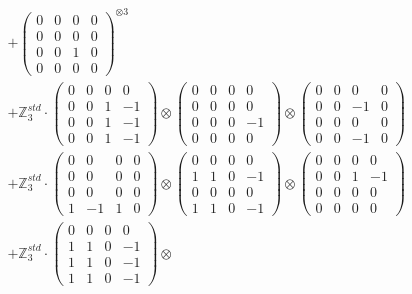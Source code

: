 \documentclass{article}
\begin{document}
{\begin{align}
        &+ \label{Rs16-Rc11-Solution-15-c16} \begin{pmatrix} 0 & 0 & 0 & 0 \\ 0 & 0 & 0 & 0 \\ 0 & 0 & 1 & 0 \\ 0 & 0 & 0 & 0 \end{pmatrix}^{\otimes 3} \\
        &+ \label{Rs16-Rc11-Solution-15-c17} \mathbb{Z}_3^{std} \cdot 
            \begin{pmatrix} 0 & 0 & 0 & 0 \\ 0 & 0 & 1 & -1 \\ 0 & 0 & 1 & -1 \\ 0 & 0 & 1 & -1 \end{pmatrix} \otimes 
            \begin{pmatrix} 0 & 0 & 0 & 0 \\ 0 & 0 & 0 & 0 \\ 0 & 0 & 0 & -1 \\ 0 & 0 & 0 & 0 \end{pmatrix} \otimes 
            \begin{pmatrix} 0 & 0 & 0 & 0 \\ 0 & 0 & -1 & 0 \\ 0 & 0 & 0 & 0 \\ 0 & 0 & -1 & 0 \end{pmatrix} \\ 
        &+ \label{Rs16-Rc11-Solution-15-c18} \mathbb{Z}_3^{std} \cdot 
            \begin{pmatrix} 0 & 0 & 0 & 0 \\ 0 & 0 & 0 & 0 \\ 0 & 0 & 0 & 0 \\ 1 & -1 & 1 & 0 \end{pmatrix} \otimes 
            \begin{pmatrix} 0 & 0 & 0 & 0 \\ 1 & 1 & 0 & -1 \\ 0 & 0 & 0 & 0 \\ 1 & 1 & 0 & -1 \end{pmatrix} \otimes 
            \begin{pmatrix} 0 & 0 & 0 & 0 \\ 0 & 0 & 1 & -1 \\ 0 & 0 & 0 & 0 \\ 0 & 0 & 0 & 0 \end{pmatrix} \\ 
        &+ \label{Rs16-Rc11-Solution-15-c19} \mathbb{Z}_3^{std} \cdot 
            \begin{pmatrix} 0 & 0 & 0 & 0 \\ 1 & 1 & 0 & -1 \\ 1 & 1 & 0 & -1 \\ 1 & 1 & 0 & -1 \end{pmatrix} \otimes 

\end{align}}
\end{document}
